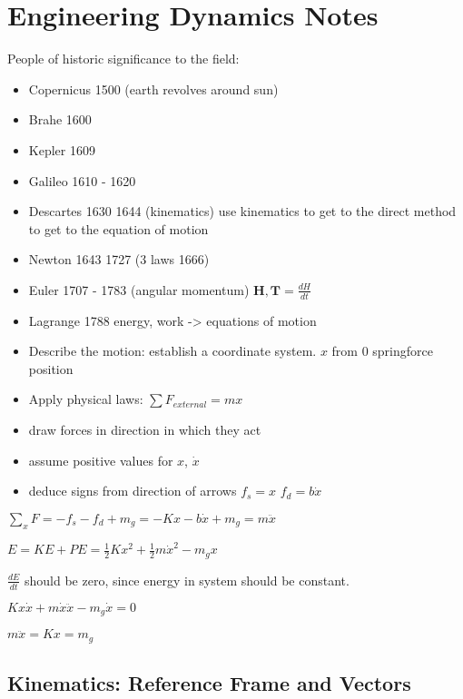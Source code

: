 \section{Engineering Dynamics Notes}

People of historic significance to the field:
\begin{itemize}
\item Copernicus 1500 (earth revolves around sun)
\item Brahe 1600
\item Kepler 1609
\item Galileo 1610 - 1620
\item Descartes 1630 1644 (kinematics) use kinematics to get to the direct method to get to the equation of motion
\item Newton 1643 1727 (3 laws 1666)
\item Euler 1707 - 1783 (angular momentum) $\mathbf H, \mathbf T = \frac{dH}{dt}$
\item Lagrange 1788 energy, work -> equations of motion
\end{itemize}

\begin{tikzpicture}
  
\end{tikzpicture}


\begin{itemize}
  \item Describe the motion: establish a coordinate system. $x$ from $0$ springforce position
  \item Apply physical laws: $\sum F_{external} = mx$
\end{itemize}    

\begin{itemize}
  \item draw forces in direction in which they act
  \item assume positive values for $x$, $\dot{x}$
  \item deduce signs from direction of arrows
      $f_s = x$
      $f_d = b\dot{x}$
\end{itemize}

$\sum_x F = -f_s - f_d + m_g = -Kx - b\dot{x} + m_g = m\ddot{x}$ 

\begin{tikzpicture}
  
\end{tikzpicture}

$E = KE + PE = \frac{1}{2}Kx^2+\frac{1}{2}m\dot{x}^2-m_g x$

$\frac{dE}{dt}$ should be zero, since energy in system should be constant.

$Kx\dot{x} + m\dot{x}\ddot{x} - m_g\dot{x} = 0$

$m\ddot{x} =  Kx = m_g$

\subsection{Kinematics: Reference Frame and Vectors}

